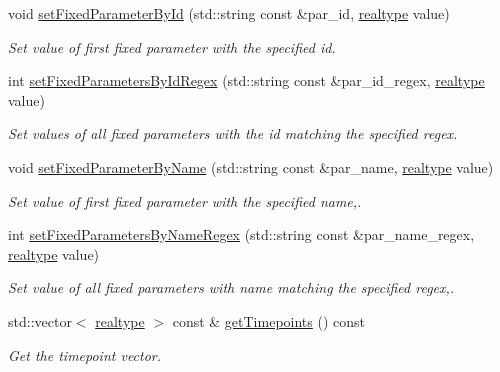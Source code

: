 \begin{DoxyCompactItemize}
void \mbox{\hyperlink{classamici_1_1_model_adc0d24343c6fed2e797fb402f7c2d256}{set\+Fixed\+Parameter\+By\+Id}} (std\+::string const \&par\+\_\+id, \mbox{\hyperlink{namespaceamici_a1bdce28051d6a53868f7ccbf5f2c14a3}{realtype}} value)
\begin{DoxyCompactList}\small\item\em Set value of first fixed parameter with the specified id. \end{DoxyCompactList}\item 
int \mbox{\hyperlink{classamici_1_1_model_acda9b9debfd3d6ac77e2d27a48bfb5d6}{set\+Fixed\+Parameters\+By\+Id\+Regex}} (std\+::string const \&par\+\_\+id\+\_\+regex, \mbox{\hyperlink{namespaceamici_a1bdce28051d6a53868f7ccbf5f2c14a3}{realtype}} value)
\begin{DoxyCompactList}\small\item\em Set values of all fixed parameters with the id matching the specified regex. \end{DoxyCompactList}\item 
void \mbox{\hyperlink{classamici_1_1_model_af1225439bd6deceb98b224e75a960800}{set\+Fixed\+Parameter\+By\+Name}} (std\+::string const \&par\+\_\+name, \mbox{\hyperlink{namespaceamici_a1bdce28051d6a53868f7ccbf5f2c14a3}{realtype}} value)
\begin{DoxyCompactList}\small\item\em Set value of first fixed parameter with the specified name,. \end{DoxyCompactList}\item 
int \mbox{\hyperlink{classamici_1_1_model_a4802f7d56264e3b592c167da8166cb73}{set\+Fixed\+Parameters\+By\+Name\+Regex}} (std\+::string const \&par\+\_\+name\+\_\+regex, \mbox{\hyperlink{namespaceamici_a1bdce28051d6a53868f7ccbf5f2c14a3}{realtype}} value)
\begin{DoxyCompactList}\small\item\em Set value of all fixed parameters with name matching the specified regex,. \end{DoxyCompactList}\item 
std\+::vector$<$ \mbox{\hyperlink{namespaceamici_a1bdce28051d6a53868f7ccbf5f2c14a3}{realtype}} $>$ const  \& \mbox{\hyperlink{classamici_1_1_model_a50ea5198d117f8f4ad1e34bb279975c8}{get\+Timepoints}} () const
\begin{DoxyCompactList}\small\item\em Get the timepoint vector. \end{DoxyCompactList}\item 

\end{DoxyCompactItemize}
